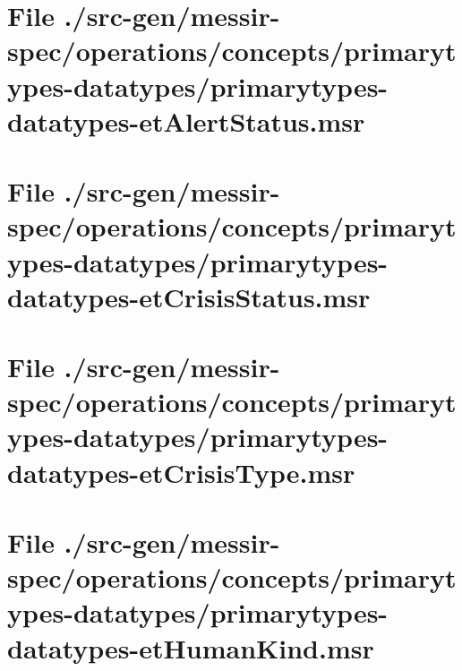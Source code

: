 \section[File /src-gen/messir-spec.../primarytypes-datatypes-etAlertStatus.msr]{File ./src-gen/messir-spec/operations/concepts/primarytypes-datatypes/primarytypes-datatypes-etAlertStatus.msr}
\scriptsize

\normalsize
	
\section[File /src-gen/messir-spec.../primarytypes-datatypes-etCrisisStatus.msr]{File ./src-gen/messir-spec/operations/concepts/primarytypes-datatypes/primarytypes-datatypes-etCrisisStatus.msr}
\scriptsize

\normalsize
	
\section[File /src-gen/messir-spec/operations.../primarytypes-datatypes-etCrisisType.msr]{File ./src-gen/messir-spec/operations/concepts/primarytypes-datatypes/primarytypes-datatypes-etCrisisType.msr}
\scriptsize

\normalsize
	
\section[File /src-gen/messir-spec/operations.../primarytypes-datatypes-etHumanKind.msr]{File ./src-gen/messir-spec/operations/concepts/primarytypes-datatypes/primarytypes-datatypes-etHumanKind.msr}
\scriptsize

\normalsize
	
